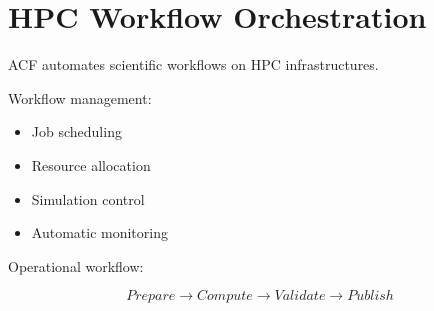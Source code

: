 \section{HPC Workflow Orchestration}


ACF automates scientific workflows on HPC infrastructures.



Workflow management:


\begin{itemize}

\item Job scheduling

\item Resource allocation

\item Simulation control

\item Automatic monitoring

\end{itemize}



Operational workflow:


\[
Prepare
\rightarrow
Compute
\rightarrow
Validate
\rightarrow
Publish
\]

